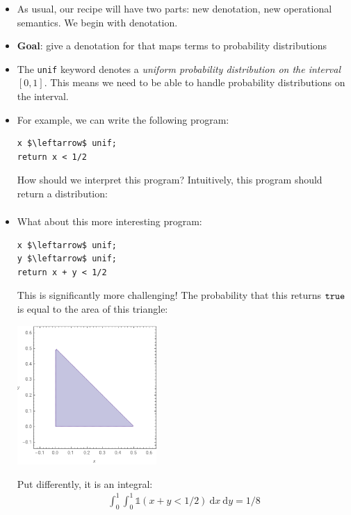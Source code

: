 \documentclass{tufte-handout}
\begin{document}
\begin{itemize}
  \item As usual, our recipe will have two parts: new denotation, new
  operational semantics. We begin with denotation.

  \item \textbf{Goal}: give a denotation for \cont{} that maps terms to
  probability distributions

  \item The \texttt{unif} keyword denotes a \emph{uniform probability
  distribution on the interval} $[0,1]$. This means we need to be able to handle
  probability distributions on the interval. 

  \item For example, we can write the following program:
\begin{lstlisting}[mathescape=true]
x $\leftarrow$ unif;
return x < 1/2
\end{lstlisting}
How should we interpret this program? Intuitively, this program should 
return a distribution:
\begin{align*}
  [\true \mapsto 1/2, \false \mapsto 1/2]
\end{align*}

\item What about this more interesting program:
\begin{lstlisting}[mathescape=true]
x $\leftarrow$ unif;
y $\leftarrow$ unif;
return x + y < 1/2
\end{lstlisting}

This is significantly more challenging! The probability that this returns 
$\texttt{true}$ is equal to the area of this triangle:

\begin{center}
\includegraphics[width=200px]{ineq-plot.png}
\end{center}

Put differently, it is an integral:
\begin{align}
  \int_0^1 \int_0^1 \mathbb{1}(x + y < 1/2)~\mathrm{d}x~\mathrm{d}y = 1/8
\end{align}

\end{itemize}
\end{document}
